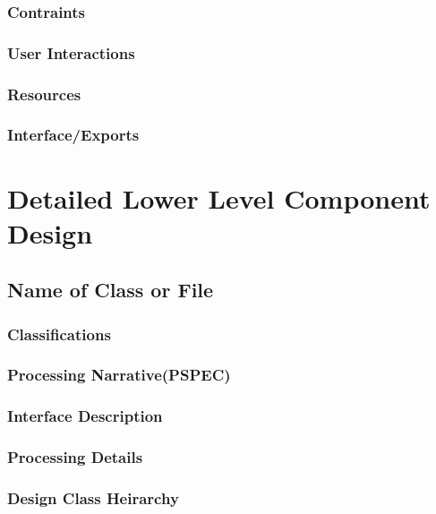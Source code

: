 \documentclass[11pt]{article}
\begin{document}
\subsubsection{Contraints}
\label{sec:constraints}

\subsubsection{User Interactions}
\label{sec:interactions}

\subsubsection{Resources}
\label{sec:resources}

\subsubsection{Interface/Exports}
\label{sec:exports}

\section{Detailed Lower Level Component Design}
\label{sec:lower}

\subsection{Name of Class or File}
\label{sec:class}

\subsubsection{Classifications}
\label{sec:classifications}

\subsubsection{Processing Narrative(PSPEC)}
\label{sec:pspec}

\subsubsection{Interface Description}
\label{sec:interface}

\subsubsection{Processing Details}
\label{sec:details}

\subsubsection{Design Class Heirarchy}
\label{sec:heirarchy}
\end{document}
